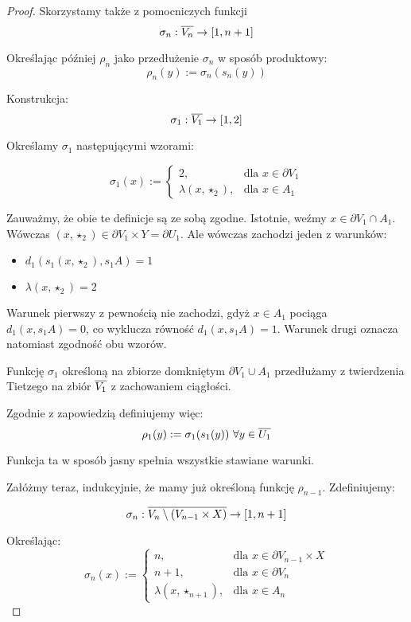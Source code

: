\begin{thm}
\begin{proof}
  Skorzystamy także z pomocniczych funkcji
  \[\sigma_n: \overline{V_n} \rightarrow [1,n+1]\]
  
  Określając później $\rho_n$ jako przedłużenie $\sigma_n$ w sposób produktowy:
  \[\rho_n(y) := \sigma_n(s_n(y))\]

  Konstrukcja:
  \[\sigma_1: \overline{V_1} \rightarrow [1,2]\]
  
  Określamy $\sigma_1$ następującymi wzorami:
  
  \[
  \sigma_1(x) := 
    \begin{cases}
      2,&\mbox{dla }x \in \partial V_1 \\
      \lambda(x, \star_2),& \mbox{dla }x \in A_1 
    \end{cases}
  \]
  
  Zauważmy, że obie te definicje są ze sobą zgodne. Istotnie, weźmy $x \in \partial V_1 \cap A_1$. Wówczas $(x, \star_2) \in \partial V_1 \times Y = \partial U_1$. Ale wówczas zachodzi jeden z warunków:
  
  \begin{itemize}
    \item $d_1(s_1 (x, \star_2), s_1 A) = 1$
    \item $\lambda(x, \star_2) = 2$
  \end{itemize}

  Warunek pierwszy z pewnością nie zachodzi, gdyż $x \in A_1$ pociąga $d_1(x, s_1 A) = 0$, co wyklucza równość $d_1(x, s_1 A) = 1$.
  Warunek drugi oznacza natomiast zgodność obu wzorów.
  
  Funkcję $\sigma_1$ określoną na zbiorze domkniętym $\partial V_1 \cup A_1$ przedłużamy z twierdzenia Tietzego na zbiór $\overline{V_1}$ z zachowaniem ciągłości.
  
  Zgodnie z zapowiedzią definiujemy więc:
  \[\rho_1(y) := \sigma_1(s_1(y))\ \forall y \in \overline{U_1}\]
  
  Funkcja ta w sposób jasny spełnia wszystkie stawiane warunki.
  
  Załóżmy teraz, indukcyjnie, że mamy już określoną funkcję $\rho_{n-1}$. Zdefiniujemy:
  
  \[\sigma_n: \overline{V_n \setminus (V_{n-1} \times X)} \rightarrow [1,n+1]\]
  
  Określając:
  \[
  \sigma_n(x) := 
    \begin{cases}
      n,&\mbox{dla }x \in \partial V_{n-1} \times X \\
      n+1,&\mbox{dla }x \in \partial V_n \\
      \lambda(x, \star_{n+1}),&\mbox{dla }x \in A_n
    \end{cases}
  \]


\end{proof}
\end{thm}
